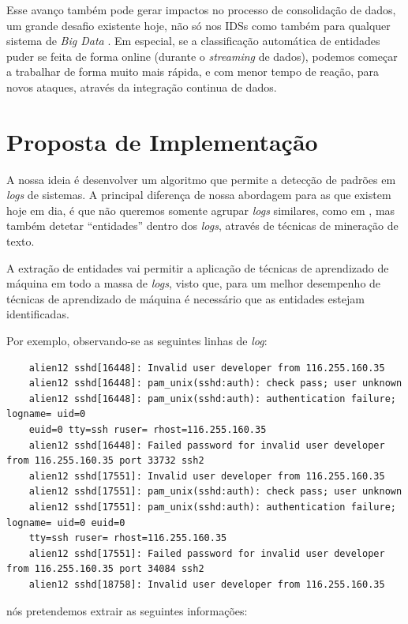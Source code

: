 \documentclass[
	12pt,				%
	openright,			%
	twoside,			%
	a4paper,			%
	english,			%
	french,				%
	spanish,			%
	brazil,				%
	]{abntex2}
\begin{document}
Esse avanço também pode gerar impactos no processo de consolidação de dados, um grande desafio existente hoje, não só nos IDSs como também para qualquer sistema de \emph{Big Data} \cite{zuech2015intrusion}. Em especial, se a classificação automática de entidades puder se feita de forma online (durante o  \emph{streaming} de dados), podemos começar a trabalhar de forma muito mais rápida, e com menor tempo de reação, para novos ataques, através da integração continua de dados.

\section{Proposta de Implementação}\label{sec:implementacao}

A nossa ideia é desenvolver um algoritmo que permite a detecção de padrões em \emph{logs} de sistemas. A principal diferença de nossa abordagem para as que existem hoje em dia, é que não queremos somente agrupar \emph{logs} similares, como em \cite{vaarandi2003data}, mas também detetar ``entidades'' dentro dos \emph{logs}, através de técnicas de mineração de texto.

A extração de entidades vai permitir a aplicação de técnicas de aprendizado de máquina em todo a massa de \emph{logs}, visto que, para um melhor desempenho de técnicas de aprendizado de máquina é necessário que as entidades estejam identificadas.

Por exemplo, observando-se as seguintes linhas de \emph{log}:

{\tiny
	\begin{verbatim}
	alien12 sshd[16448]: Invalid user developer from 116.255.160.35
	alien12 sshd[16448]: pam_unix(sshd:auth): check pass; user unknown
	alien12 sshd[16448]: pam_unix(sshd:auth): authentication failure; logname= uid=0 
	euid=0 tty=ssh ruser= rhost=116.255.160.35 
	alien12 sshd[16448]: Failed password for invalid user developer from 116.255.160.35 port 33732 ssh2
	alien12 sshd[17551]: Invalid user developer from 116.255.160.35
	alien12 sshd[17551]: pam_unix(sshd:auth): check pass; user unknown
	alien12 sshd[17551]: pam_unix(sshd:auth): authentication failure; logname= uid=0 euid=0 
	tty=ssh ruser= rhost=116.255.160.35 
	alien12 sshd[17551]: Failed password for invalid user developer from 116.255.160.35 port 34084 ssh2
	alien12 sshd[18758]: Invalid user developer from 116.255.160.35
	\end{verbatim}
}

nós pretendemos extrair as seguintes informações:
\end{document}
